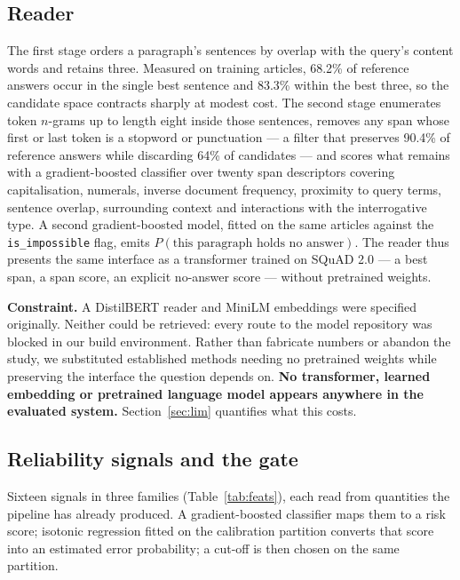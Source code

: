 \documentclass[conference]{IEEEtran}
\begin{document}
\subsection{Reader}
The first stage orders a paragraph's sentences by overlap with the query's content
words and retains three. Measured on training articles, 68.2\% of reference answers
occur in the single best sentence and 83.3\% within the best three, so the
candidate space contracts sharply at modest cost. The second stage enumerates token
$n$-grams up to length eight inside those sentences, removes any span whose first
or last token is a stopword or punctuation --- a filter that preserves 90.4\% of
reference answers while discarding 64\% of candidates --- and scores what remains
with a gradient-boosted classifier over twenty span descriptors covering
capitalisation, numerals, inverse document frequency, proximity to query terms,
sentence overlap, surrounding context and interactions with the interrogative type.
A second gradient-boosted model, fitted on the same articles against the
\texttt{is\_impossible} flag, emits $P(\text{this paragraph holds no answer})$. The
reader thus presents the same interface as a transformer trained on SQuAD 2.0 --- a
best span, a span score, an explicit no-answer score --- without pretrained weights.

\textbf{Constraint.} A DistilBERT reader and MiniLM embeddings were specified
originally. Neither could be retrieved: every route to the model repository was
blocked in our build environment. Rather than fabricate numbers or abandon the
study, we substituted established methods needing no pretrained weights while
preserving the interface the question depends on. \textbf{No transformer, learned
embedding or pretrained language model appears anywhere in the evaluated system.}
Section~\ref{sec:lim} quantifies what this costs.

\subsection{Reliability signals and the gate}
Sixteen signals in three families (Table~\ref{tab:feats}), each read from
quantities the pipeline has already produced. A gradient-boosted classifier maps
them to a risk score; isotonic regression \cite{zadrozny2002} fitted on the
calibration partition converts that score into an estimated error probability; a
cut-off is then chosen on the same partition.
\end{document}
